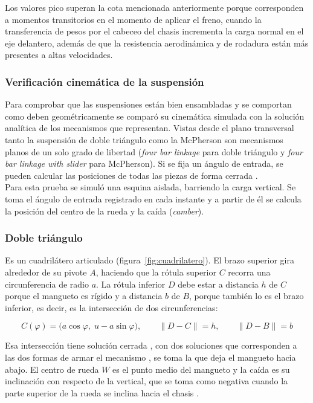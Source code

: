 Los valores pico superan la cota mencionada anteriormente porque corresponden a momentos transitorios en el momento de aplicar el freno, cuando la transferencia de pesos por el cabeceo del chasis incrementa la carga normal en el eje delantero, además de que la resistencia aerodinámica y de rodadura están más presentes a altas velocidades.


\subsubsection{Verificación cinemática de la suspensión}

Para comprobar que las suspensiones están bien ensambladas y se comportan como deben geométricamente se comparó su cinemática simulada con la solución analítica de los mecanismos que representan. Vistas desde el plano transversal tanto la suspensión de doble triángulo como la McPherson son mecanismos planos de un solo grado de libertad (\textit{four bar linkage} para doble triángulo y \textit{four bar linkage with slider} para McPherson). Si se fija un ángulo de entrada, se pueden calcular las posiciones de todas las piezas de forma cerrada \cite{ual_tmm_posicion}. \\
Para esta prueba se simuló una esquina aislada, barriendo la carga vertical. Se toma el ángulo de entrada registrado en cada instante y a partir de él se calcula la posición del centro de la rueda y la caída (\textit{camber}).

\subsubsection{Doble triángulo}

Es un cuadrilátero articulado (figura~\ref{fig:cuadrilatero}). El brazo superior gira alrededor de su pivote $A$, haciendo que la rótula superior $C$ recorra una circunferencia de radio $a$.  La rótula inferior $D$ debe estar a distancia $h$ de $C$ porque el mangueto es rígido y a distancia $b$ de $B$, porque también lo es el brazo inferior, es decir, es la intersección de dos circunferencias:

\begin{equation}
	C(\varphi) = \bigl(a\cos\varphi,\; u - a\sin\varphi\bigr), \qquad
	\lVert D - C \rVert = h, \qquad \lVert D - B \rVert = b
\end{equation}

Esa intersección tiene solución cerrada \cite{bourke_circles}, con dos soluciones que corresponden a las dos formas de armar el mecanismo \cite{ual_tmm_posicion}, se toma la que deja el mangueto hacia abajo. El centro de rueda $W$ es el punto medio del mangueto y la caída es su inclinación con respecto de la vertical, que se toma como negativa cuando la parte superior de la rueda se inclina hacia el chasis \cite{kistler_camber}.


